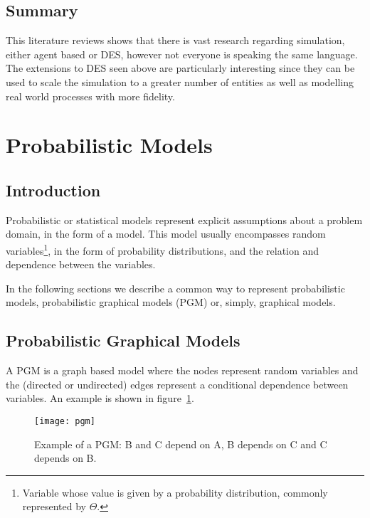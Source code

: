 \subsection{Summary}

This literature reviews shows that there is vast research regarding simulation, 
either agent based or DES, however not everyone is speaking the same language. 
The extensions to DES seen above are particularly interesting since they can be 
used to scale the simulation to a greater number of entities as well as 
modelling real world processes with more fidelity.

\section{Probabilistic Models} \label{sec:models}

\subsection{Introduction}

Probabilistic or statistical models represent explicit assumptions about a 
problem domain, in the form of a model. This model usually encompasses random 
variables\footnote{Variable whose value is given by a probability distribution, 
commonly represented by $\Theta$.}, in the form of probability distributions,  
and the relation and dependence between the variables.~\cite{Winn2013}

In the following sections we describe a common way to represent probabilistic 
models, probabilistic graphical models (PGM) or, simply, graphical models.

\subsection{Probabilistic Graphical Models}

A PGM is a graph based model where the nodes represent random variables and the 
(directed or undirected) edges represent a conditional dependence between 
variables. An example is shown in figure~\ref{fig:pgm}.

\begin{figure}[h]
    \begin{center}
        \leavevmode
        \texttt{[image: pgm]}
        \caption{Example of a PGM: B and C depend on A, B depends on C and C 
            depends on B.}
        \label{fig:pgm}
    \end{center}
\end{figure}

